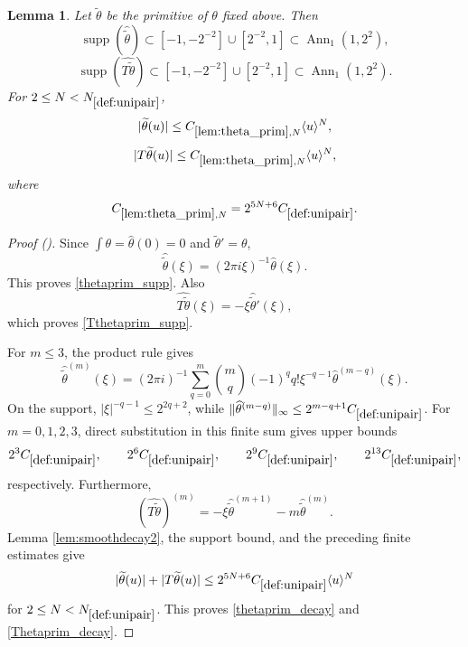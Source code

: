 \documentclass[12pt,reqno]{amsart}
\newcommand{\auto}{{({\tiny\faCar})}}
\theoremstyle{plain}
\newtheorem{lemma}[theorem]{Lemma}
\numberwithin{equation}{section}
\theoremstyle{remark}
\newcommand{\uses}[1]{}
\newcommand{\usesdefs}[1]{}
\begin{document}
\begin{lemma}\label{lem:theta_prim}\uses{lem:smoothdecay2}\usesdefs{bracket bump,def:cn-window,def:unipair,defn:window based bump functions}
Let $\widetilde\theta$ be the primitive of $\theta$ fixed above. Then
\begin{equation}\label{thetaprim_supp}
\operatorname{supp}(\widehat{\widetilde\theta})
\subset[-1,-2^{-2}]\cup[2^{-2},1]
\subset\operatorname{Ann}_1(1,2^2),
\end{equation}
\begin{equation}\label{Tthetaprim_supp}
\operatorname{supp}(\widehat{T\widetilde\theta})
\subset[-1,-2^{-2}]\cup[2^{-2},1]
\subset\operatorname{Ann}_1(1,2^2).
\end{equation}
For $2\le N<N_{\ref{def:unipair}}$,
\begin{equation}\label{thetaprim_decay}
|\widetilde\theta(u)|
\le C_{\ref{lem:theta_prim},N}\langle u\rangle^N,
\end{equation}
\begin{equation}\label{Thetaprim_decay}
|T\widetilde\theta(u)|
\le C_{\ref{lem:theta_prim},N}\langle u\rangle^N,
\end{equation}
where
\begin{equation}\label{auto:theta-primitive-constant-definition}
C_{\ref{lem:theta_prim},N}
=2^{5N+6}C_{\ref{def:unipair}}.
\end{equation}
\end{lemma}
\begin{proof}[Proof \auto]
Since $\int\theta=\widehat\theta(0)=0$ and $\widetilde\theta'=\theta$,
\[
\widehat{\widetilde\theta}(\xi)=(2\pi i\xi)^{-1}\widehat\theta(\xi).
\]
This proves \eqref{thetaprim_supp}. Also
\[
\widehat{T\widetilde\theta}(\xi)
=-\xi\widehat{\widetilde\theta}'(\xi),
\]
which proves \eqref{Tthetaprim_supp}.

For $m\le3$, the product rule gives
\[
\widehat{\widetilde\theta}^{(m)}(\xi)
=(2\pi i)^{-1}
\sum_{q=0}^m\binom{m}{q}(-1)^q q!\xi^{-q-1}
\widehat\theta^{(m-q)}(\xi).
\]
On the support, $|\xi|^{-q-1}\le2^{2q+2}$, while
$\|\widehat\theta^{(m-q)}\|_\infty\le2^{m-q+1}C_{\ref{def:unipair}}$. For $m=0,1,2,3$, direct substitution in this finite sum gives upper bounds
\[
2^3C_{\ref{def:unipair}},
\qquad
2^6C_{\ref{def:unipair}},
\qquad
2^9C_{\ref{def:unipair}},
\qquad
2^{13}C_{\ref{def:unipair}},
\]
respectively. Furthermore,
\[
(\widehat{T\widetilde\theta})^{(m)}
=-\xi\widehat{\widetilde\theta}^{(m+1)}
-m\widehat{\widetilde\theta}^{(m)}.
\]
Lemma \ref{lem:smoothdecay2}, the support bound, and the preceding finite estimates give
\[
|\widetilde\theta(u)|+|T\widetilde\theta(u)|
\le2^{5N+6}C_{\ref{def:unipair}}\langle u\rangle^N
\]
for $2\le N<N_{\ref{def:unipair}}$. This proves \eqref{thetaprim_decay} and \eqref{Thetaprim_decay}.
\end{proof}
\end{document}
